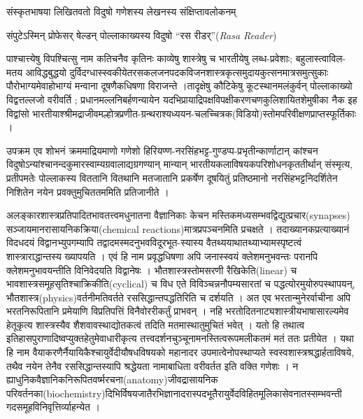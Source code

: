 {\dev संस्कृतभाषया लिखितवतो विदुषो गणेशस्य लेखनस्य संक्षिप्तावलोकनम्}




{\dev संपुटेऽस्मिन् प्रोफेसर् षेल्डन् पोल्लाकाख्यस्य विदुषो “रस रीडर्”}(\textsl{Rasa Reader})

{\dev पाश्चात्त्येषु विपश्चित्सु नाम कतिचनैव कृतिनः काव्येषु शास्त्रेषु च भारतीयेषु लब्ध-प्रवेशाः; बहुलास्त्वाविल-मतय आविद्धबुद्धयो दुर्विदग्धास्स्वकीयेतरसकलजनपदकविजनशास्त्र\-कृत्स\-मुदायकुत्सनमात्रसमुत्सुकाः पौरोभाग्य\-मेवाहोभाग्यं मन्वाना दूषणैकधिषणा विराजन्ते ।\break तादृक्षेषु कौटिकेषु कूटस्थानमलंकुर्वन् पोल्लाकाख्यो विद्वत्तल्लजो वरीवर्ति ; प्रधानमल्लनिबर्ह\-णन्यायेन यदभिप्रायाद्रिपक्षविपक्षीकरणचणकुलिशायितशेमुषीका नैक इह विद्वांसो भारतीया\-श्श्रीमद्राजीवमल्होत्रप्रणीत-ग्रन्थराश्यध्ययन-चलच्चित्रक(विडियो)स्तोमपरिवीक्षणप्राप्त\-स्फूर्तिकाः ।}

{\dev उपक्रम एव शोभनं क्रममाद्रियमाणो गणेशो हिरियण्ण-नरसिंहभट्ट-गुण्डप्प-प्रभृतीन्\break कार्णाटान् कांश्चन  विदुषोऽन्यांश्चानन्दकुमारस्वाम्यग्रवालाद्यग्रगण्यान् मान्यान् भारतीयकला\-विषयक\-परिशोधनकृततीर्थान् संस्मृत्य, प्रतीपमतेः पोल्लाकस्य विततानि वितथानि मतजातानि प्रकर्षेण दूषयितुं प्रतिष्ठमानो नरसिंह\-भट्ट\-निदर्शितेन निशितेन नयेन प्रवक्तुमुचिततममिति प्रति\-जानीते ।}

{\dev अलङ्कारशास्त्रप्रतिपादितभावतत्त्वमधुनातना वैज्ञानिकाः केचन मस्तिकमध्यसम्भवद्विद्यु\break\-त्प्रचार}(synapses) {\dev सञ्जायमानरासायनिकक्रिया}(chemical reactions){\dev मात्रप्रपञ्चनमिति प्रचक्षते । तदाख्यानकप्रत्याख्यानं विदधदयं विद्वानभ्युपगम्यापि तद्वादमस्मदनुभवविदूरभूत-\break\-स्यास्य वैतथ्ययाथातथ्याभ्यामस्पृष्टत्वं शास्त्राराद्धा\-न्तस्य ख्यापयति । एवं हि नाम प्रवृद्धधिषणा अपि जनास्स्वयं क्लेशमनुभवन्तः परानपि क्लेशमनुभावयन्तीति विनिवेदयति विद्वानेषः । भौत\-शास्त्रस्तोमसरणी रैखिकेति}(linear) {\dev च भावशास्त्र\-समूहसृतिश्चाक्रिकीति}(cyclical) {\dev च विध एते विविञ्चन्ननौपम्यसारतां च पद्धत्योरमुयोरुपस्थापयन्, भौतशास्त्र}(physics){\dev वर्तनीमति\-वर्तते रससिद्धान्तपद्धतिरिति च दर्शयति । अत एव भरतान्मुनेरर्वाचीना अपि भरतनिरूपितानि प्रमेयाणि विप्रतिपत्तिं विनैवोररीकर्तुं प्राभवन् । नहि भरतोदितनाट्य\-शास्त्रीयभाषासारल्यमेव हेतूकृत्य शास्त्रस्यैव शैशवावस्थाद्योतकत्वं तदिति मतमास्थातुमुचितं भवेत् । यतो हि तथात्व इतिहासपुराणादिष्वप्युक्तहेतुमेवाधारीकृत्य तत्त्वदर्शनचुञ्चूनामनस्ति\-त्वरूपमलीकतमं मतं ततः प्रती\break\-येत । यथा हि नाम वैयाकरणैर्नैयायिकैश्चायुर्वेदीयौषधविषयको महानादर उपमात्वेनोपस्था\-प्यते स्वस्वशास्त्रश्रद्धार्हताविषये, तथैव नयेन तेनैव रससिद्धान्तस्यापि श्रद्धेयता नामाबाधिता वरीवर्तत इति वक्ति गणेशः । न ह्याधुनिकवैज्ञानिकनिरूपितवर्ष्मरचना}(anatomy){\dev जीवद्रासायनिक परिवर्तनका}(biochemistry){\dev दिभिर्विषयजातैरभिज्ञानादरास्पदभूतैरायुर्वेदविहित\-मूलिका\break\-सेवनातस्सम्भवन्ती गदसमूहविनिवृत्तिर्व्याहन्येत ।}

